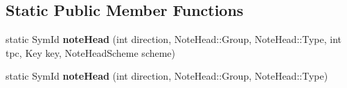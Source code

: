 \subsection*{Static Public Member Functions}
\begin{DoxyCompactItemize}
\item 
\mbox{\label{class_ms_1_1_note_ac618e1fc375ebd6c5abcb15d4d97468a}} 
static Sym\+Id {\bfseries note\+Head} (int direction, Note\+Head\+::\+Group, Note\+Head\+::\+Type, int tpc, Key key, Note\+Head\+Scheme scheme)
\item 
\mbox{\label{class_ms_1_1_note_a2d5aa211d9b5f1c88c782c19f47eb2d9}} 
static Sym\+Id {\bfseries note\+Head} (int direction, Note\+Head\+::\+Group, Note\+Head\+::\+Type)
\end{DoxyCompactItemize}
